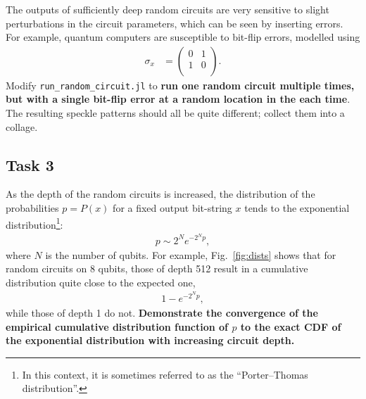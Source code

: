 \documentclass[12pt]{article}
\begin{document}
The outputs of sufficiently deep random circuits are very sensitive to slight perturbations in the circuit parameters, which can be seen by inserting errors.
For example, quantum computers are susceptible to bit-flip errors, modelled using
\begin{align}
	\sigma_x
	&= \begin{pmatrix}
			0 & 1 \\
			1 & 0 \\
		\end{pmatrix}.
\end{align}
Modify \texttt{run\_random\_circuit.jl} to \textbf{run one random circuit multiple times, but with a single bit-flip error at a random location in the each time}.
The resulting speckle patterns should all be quite different; collect them into a collage.


\subsection*{Task 3}

As the depth of the random circuits is increased, the distribution of the probabilities $p = P(x)$ for a fixed output bit-string $x$ tends to the exponential distribution\footnote{
	In this context, it is sometimes referred to as the ``Porter--Thomas distribution''.
}:
\begin{align}
	p \sim 2^N e^{-2^N p},
\end{align}
where $N$ is the number of qubits.
For example, Fig.~\ref{fig:dists} shows that for random circuits on 8 qubits, those of depth 512 result in a cumulative distribution quite close to the expected one,
\begin{align}
	1 - e^{-2^N p},
\end{align}
while those of depth 1 do not.
\textbf{Demonstrate the convergence of the empirical cumulative distribution function of $p$ to the exact CDF of the exponential distribution with increasing circuit depth.}
\end{document}
